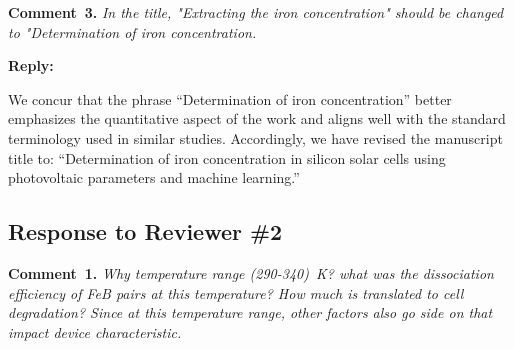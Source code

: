 \documentclass[a4paper,fleqn]{cas-sc}
\begin{document}

\vspace{1cm}
\noindent
\textcolor[rgb]{0.00,0.50,1.00}{\textbf{Comment~3.}}
\emph{In the title, "Extracting the iron concentration" should be changed to "Determination of iron concentration.}

\noindent
\textcolor[rgb]{0.51,0.00,0.00}{\textbf{Reply:}}

We concur that the phrase ``Determination of iron concentration'' better emphasizes the quantitative aspect
of the work and aligns well with the standard terminology used in similar studies.
Accordingly, we have revised the manuscript title to:
``Determination of iron concentration in silicon solar cells using photovoltaic parameters and machine learning.''


\vspace{1cm}
\subsection*{Response to Reviewer \#2 }

\noindent
\textcolor[rgb]{0.00,0.50,1.00}{\textbf{Comment~1.}}
\emph{Why temperature range (290-340)~K?
what was the dissociation efficiency of FeB pairs at this temperature?
How much is translated to cell degradation?
Since at this temperature range, other factors also go side on that impact device characteristic.}
\end{document}
